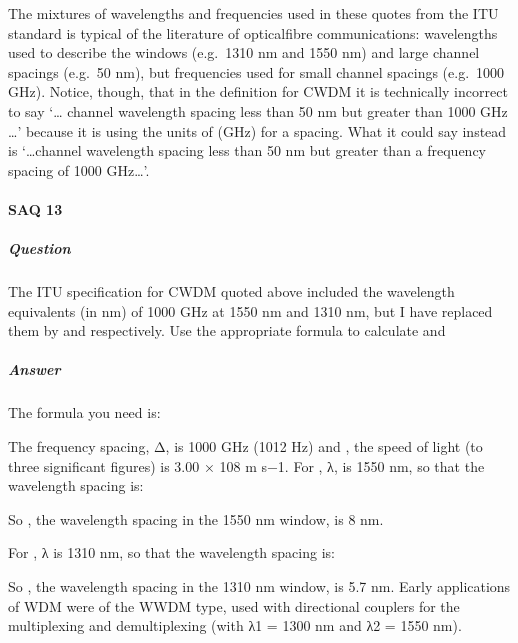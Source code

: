 \documentclass[letterpaper,10pt,english]{sphinxmanual}
\let\sphinxpxdimen\pdfpxdimen\else\newdimen\sphinxpxdimen
\begin{document}
The mixtures of wavelengths and frequencies used in these quotes from the ITU standard is typical of the literature of optical\sphinxhyphen{}fibre communications: wavelengths used to describe the windows (e.g. 1310 nm and 1550 nm) and large channel spacings (e.g. 50 nm), but frequencies used for small channel spacings (e.g. 1000 GHz). Notice, though, that in the definition for CWDM it is technically incorrect to say ‘… channel wavelength spacing less than 50 nm but greater than 1000 GHz …’ because it is using
the units of  (GHz) for a  spacing. What it could say instead is ‘…channel wavelength spacing less than 50 nm but greater than a frequency spacing of 1000 GHz…’.


\paragraph{SAQ 13}
\label{\detokenize{content/session_00/Part_00_04:SAQ-13}}

\subparagraph{Question}
\label{\detokenize{content/session_00/Part_00_04:id2}}
The ITU specification for CWDM quoted above included the wavelength equivalents (in nm) of 1000 GHz at 1550 nm and 1310 nm, but I have replaced them by  and  respectively. Use the appropriate formula to calculate  and 


\subparagraph{Answer}
\label{\detokenize{content/session_00/Part_00_04:id3}}
The formula you need is:

\sphinxincludegraphics[width=511\sphinxpxdimen,height=284\sphinxpxdimen]{{ue001i}.gif}

The frequency spacing, Δ, is 1000 GHz (1012 Hz) and , the speed of light (to three significant figures) is 3.00 × 108 m s−1. For , λ, is 1550 nm, so that the wavelength spacing is:

\sphinxincludegraphics[width=511\sphinxpxdimen,height=119\sphinxpxdimen]{{ue002i}.gif}

So , the wavelength spacing in the 1550 nm window, is 8 nm.

For , λ is 1310 nm, so that the wavelength spacing is:

\sphinxincludegraphics[width=511\sphinxpxdimen,height=119\sphinxpxdimen]{{ue003i}.gif}

So , the wavelength spacing in the 1310 nm window, is 5.7 nm. Early applications of WDM were of the WWDM type, used with directional couplers for the multiplexing and demultiplexing (with λ1 = 1300 nm and λ2 = 1550 nm).
\end{document}
